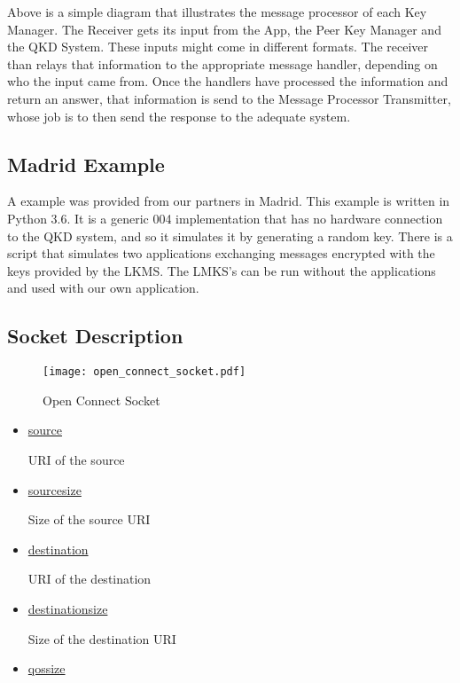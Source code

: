 \begin{refsection}
Above is a simple diagram that illustrates the message processor of each Key Manager. The Receiver gets its input from the App, the Peer Key Manager and the QKD System. These inputs might come in different formats. The receiver than relays that information to the appropriate message handler, depending on who the input came from. Once the handlers have processed the information and return an answer, that information is send to the Message Processor Transmitter, whose job is to then send the response to the adequate system.

\subsection{Madrid Example}

A example was provided from our partners in Madrid. This example is written in Python 3.6. It is a generic 004 implementation that has no hardware connection to the QKD system, and so it simulates it by generating a random key. There is a script that simulates two applications exchanging messages encrypted with the keys provided by the LKMS. The LMKS's can be run without the applications and used with our own application.

\subsection{Socket Description}

\begin{figure}[H]
	\centering
	\texttt{[image: open\_connect\_socket.pdf]}
	\caption{Open Connect Socket}
	\label{fig:openConn}
\end{figure}

\begin{itemize}
	\item\underline{source}
		
		URI of the source

	\item\underline{source\textunderscore size}

		Size of the source URI

	\item\underline{destination}

		URI of the destination

	\item\underline{destination\textunderscore size}

		Size of the destination URI

	\item\underline{qos\textunderscore size}


\end{itemize}
\end{refsection}

